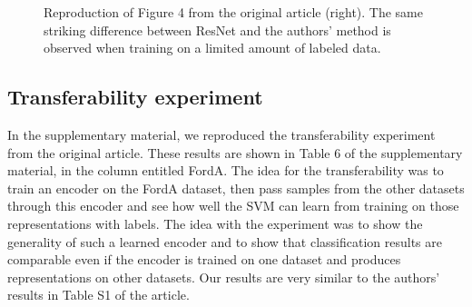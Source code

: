 \documentclass{article}
\begin{document}
\begin{figure}[h!]%
    \centering
    \qquad
    \caption{Reproduction of Figure 4 from the original article (right). The same striking difference between ResNet and the authors' method is observed when training on a limited amount of labeled data.}%
    \label{fig:sparse}%
\end{figure}

\subsection{Transferability experiment}
In the supplementary material, we reproduced the transferability experiment from the original article. These results are shown in Table 6 of the supplementary material, in the column entitled FordA. The idea for the transferability was to train an encoder on the FordA dataset, then pass samples from the other datasets through this encoder and see how well the SVM can learn from training on those representations with labels. The idea with the experiment was to show the generality of such a learned encoder and to show that classification results are comparable even if the encoder is trained on one dataset and produces representations on other datasets. Our results are very similar to the authors' results in Table S1 of the article.
\end{document}

